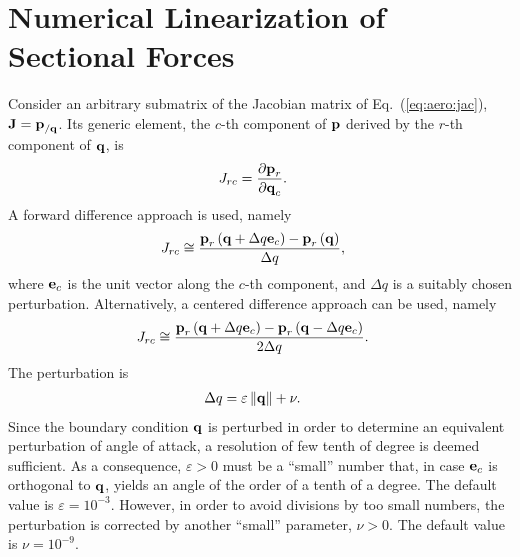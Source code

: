 \section{Numerical Linearization of Sectional Forces}
Consider an arbitrary submatrix of the Jacobian matrix
of Eq.~(\ref{eq:aero:jac}), $\bm{\mathbf{J}}=\bm{\mathbf{p}}_{/\bm{\mathbf{q}}}$.
Its generic element, the $c$-th component of $\bm{\mathbf{p}}$
derived by the $r$-th component of $\bm{\mathbf{q}}$, is
\begin{align}
	J_{rc} &= \frac{\partial\bm{\mathbf{p}}_r}{\partial\bm{\mathbf{q}}_c}
	.
\end{align}
A forward difference approach is used, namely
\begin{align}
	J_{rc} &\cong \frac{
		\bm{\mathbf{p}}_r\left( \bm{\mathbf{q}} + \Delta q \bm{\mathbf{e}}_c \right)
		- \bm{\mathbf{p}}_r\left( \bm{\mathbf{q}} \right)
	}{
		\Delta q
	}
	,
\end{align}
where $\bm{\mathbf{e}}_c$ is the unit vector along the $c$-th component,
and $\Delta q$ is a suitably chosen perturbation.
Alternatively, a centered difference approach can be used, namely
\begin{align}
	J_{rc} &\cong \frac{
		\bm{\mathbf{p}}_r\left( \bm{\mathbf{q}} + \Delta q \bm{\mathbf{e}}_c \right)
		- \bm{\mathbf{p}}_r\left( \bm{\mathbf{q}} - \Delta q \bm{\mathbf{e}}_c \right)
	}{
		2 \Delta q
	}
	.
\end{align}
The perturbation is
\begin{align}
	\Delta q &= \varepsilon \left\| \bm{\mathbf{q}} \right\| + \nu
	.
\end{align}
Since the boundary condition $\bm{\mathbf{q}}$ is perturbed in order to determine
an equivalent perturbation of angle of attack, a resolution of few tenth
of degree is deemed sufficient.
As a consequence, $\varepsilon>0$ must be a ``small'' number
that, in case $\bm{\mathbf{e}}_c$ is orthogonal to $\bm{\mathbf{q}}$,
yields an angle of the order of a tenth of a degree.
The default value is $\varepsilon=10^{-3}$.
However, in order to avoid divisions by too small numbers,
the perturbation is corrected by another ``small'' parameter,
$\nu>0$.
The default value is $\nu=10^{-9}$.




